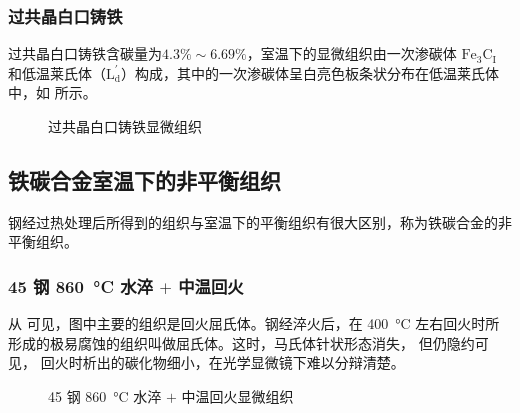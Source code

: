 \documentclass[a4paper,utf8]{article}
\begin{document}
    \subsubsection{过共晶白口铸铁}
    过共晶白口铸铁含碳量为$4.3\%\sim 6.69\%$，室温下的显微组织由一次渗碳体 $\text{Fe}_3\text{C}_\text{I}$ 和低温莱氏体（$\text{L}_\text{d}^{'}$）构成，其中的一次渗碳体呈白亮色板条状分布在低温莱氏体中，如 所示。
    \begin{figure}[!ht]
        \hspace{20pt}
        \hspace{20pt}
        \caption{过共晶白口铸铁显微组织\label{fig:n7}}
    \end{figure}
    \newpage
    \subsection{铁碳合金室温下的非平衡组织}
    钢经过热处理后所得到的组织与室温下的平衡组织有很大区别，称为铁碳合金的非平衡组织。\par

    \subsubsection{45 钢 \SI{860}{\degreeCelsius} 水淬 $+$ 中温回火\label{ss2:45sczw}}
    从 可见，图中主要的组织是回火屈氏体。钢经淬火后，在 \SI{400}{\degreeCelsius} 左右回火时所形成的极易腐蚀的组织叫做屈氏体。这时，马氏体针状形态消失， 但仍隐约可见， 回火时析出的碳化物细小，在光学显微镜下难以分辩清楚。
    \begin{figure}[!ht]
        \hspace{20pt}
        \caption{45 钢 \SI{860}{\degreeCelsius} 水淬 $+$ 中温回火显微组织\label{fig:n8}}
    \end{figure}
\end{document}
